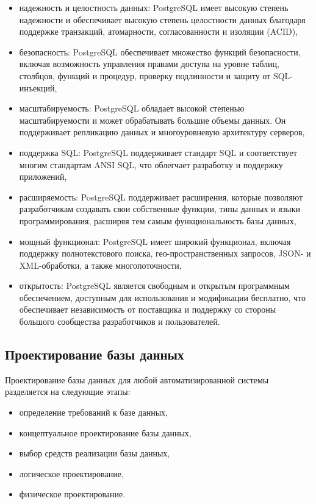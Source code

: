 \begin{itemize}
    \item надежность и целостность данных: PostgreSQL имеет высокую степень надежности и обеспечивает высокую степень целостности данных благодаря поддержке транзакций, атомарности, согласованности и изоляции (ACID),
    \item безопасность: PostgreSQL обеспечивает множество функций безопасности, включая возможность управления правами доступа на уровне таблиц, столбцов, функций и процедур, проверку подлинности и защиту от SQL-инъекций,
    \item масштабируемость: PostgreSQL обладает высокой степенью масштабируемости и может обрабатывать большие объемы данных. Он поддерживает репликацию данных и многоуровневую архитектуру серверов,
    \item поддержка SQL: PostgreSQL поддерживает стандарт SQL и соответствует многим стандартам ANSI SQL, что облегчает разработку и поддержку приложений,
    \item расширяемость: PostgreSQL поддерживает расширения, которые позволяют разработчикам создавать свои собственные функции, типы данных и языки программирования, расширяя тем самым функциональность базы данных,
    \item мощный функционал: PostgreSQL имеет широкий функционал, включая поддержку полнотекстового поиска, гео-пространственных запросов, JSON- и XML-обработки, а также многопоточности,
    \item открытость: PostgreSQL является свободным и открытым программным обеспечением, доступным для использования и модификации бесплатно, что обеспечивает независимость от поставщика и поддержку со стороны большого сообщества разработчиков и пользователей.
\end{itemize}



\subsection{Проектирование базы данных}

Проектирование базы данных для любой автоматизированной системы разделяется на следующие этапы:

\begin{itemize}
    \item определение требований к базе данных,
    \item концептуальное проектирование базы данных,
    \item выбор средств реализации базы данных,
    \item логическое проектирование,
    \item физическое проектирование.
\end{itemize}

